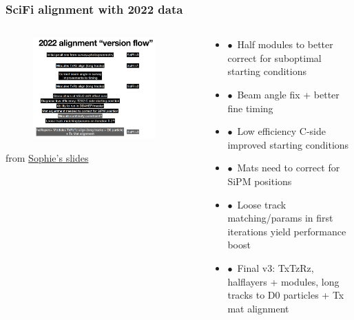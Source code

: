 \documentclass[aspectratio=1610, 12pt, xcolor=dvipsnames]{beamer}
\begin{document}
\begin{frame}\frametitle{SciFi alignment with 2022 data}
  \begin{columns}
    \begin{column}[c]{0.48\textwidth}
      \begin{figure}
        \includegraphics[width=0.9\textwidth]{plots/alignment_version_flow.png}
      \end{figure}
      from \href{https://indico.cern.ch/event/1275405/contributions/5372370/attachments/2636783/4562038/SciFiAlignUpdate_20230427.pdf}{Sophie's slides}
    \end{column}
    \begin{column}[c]{0.48\textwidth}
      \begin{itemize}
        \item $\bullet$\, Half modules to better correct for suboptimal starting conditions
        \item $\bullet$\, Beam angle fix + better fine timing
        \item $\bullet$\, Low efficiency C-side \to\, improved starting conditions
        \item $\bullet$\, Mats need to correct for SiPM positions
        \item $\bullet$\, Loose track matching/params in first iterations yield performance boost
        \item $\bullet$\, Final v3: TxTzRz, halflayers + modules, long tracks to D0 particles + Tx mat alignment
      \end{itemize}
    \end{column}
  \end{columns}
\end{frame}
\end{document}
